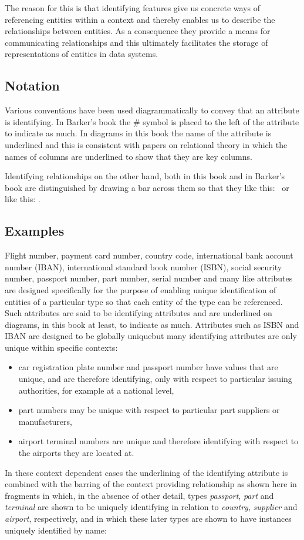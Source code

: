 \mynote
The reason for this is that identifying features give us concrete ways of referencing entities within a context and thereby enables us to describe the relationships between entities. As a consequence they provide a means for communicating  relationships and this ultimately facilitates the storage of representations of entities in data systems.

\subsection{Notation}
 \mynote
Various conventions have been used diagrammatically to convey that an attribute is identifying. In Barker's book the \# symbol is placed to the left of the attribute to indicate as much. In diagrams in this book the name of the attribute is underlined and this is consistent with papers on relational theory in which  the names of columns are underlined to show that they are key columns.

\mynote Identifying relationships on the other hand, both in this book and in Barker's book 
are distinguished by drawing a bar across them so that they like this: \barkerEllisJ\ or like this: \barkerEllisK.

 
\subsection{Examples}
\mynote
Flight number, payment card number, country code, international bank account number (IBAN), 
international standard book number (ISBN), social security number, passport number, part number, serial number and many like attributes are designed specifically for the purpose of enabling unique identification of entities of a particular type so that each entity of the type can be referenced. Such attributes are said to be identifying attributes and are underlined 
on diagrams, in this book at least, to indicate as much. 
Attributes such as ISBN and IBAN are designed to be globally uniquebut many identifying attributes are only unique within specific contexts:
\begin{itemize}
\item
car registration plate number and passport number have values that are unique, and are therefore identifying, only with respect to particular issuing authorities, for example at a national level,
\item part numbers may be unique with respect to particular part suppliers or manufacturers,
\item airport terminal numbers are unique and therefore identifying with respect to the airports they are located at.
\end{itemize}
In these context dependent cases the underlining of the identifying attribute is combined with the barring of the context providing relationship as shown here in fragments in which, in the absence of other detail, types \textit{passport}, \textit{part} and \textit{terminal} are shown to be uniquely identifying  in relation
to \textit{country}, \textit{supplier} and \textit{airport}, respectively, 
and in which these later types are shown to have instances uniquely identified by name:

